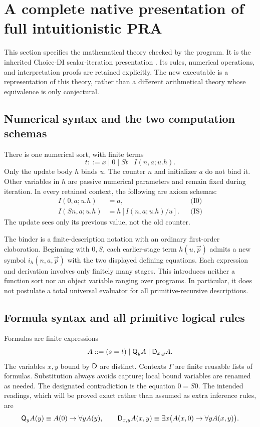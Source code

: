 \section{A complete native presentation of full intuitionistic PRA}
\label{sec:presentation}

This section specifies the mathematical theory checked by the program.
It is the inherited Choice-DI scalar-iteration presentation
\cite{uniform,arity}. Its rules, numerical operations, and interpretation
proofs are retained explicitly. The new executable is a representation
of this theory, rather than a different arithmetical theory whose
equivalence is only conjectural.

\subsection{Numerical syntax and the two computation schemas}

There is one numerical sort, with finite terms
\[
 t ::= x\mid 0\mid St\mid I(n,a;u.h).
\]
Only the update body $h$ binds $u$. The counter $n$ and initializer $a$
do not bind it. Other variables in $h$ are passive numerical parameters
and remain fixed during iteration. In every retained context, the
following are axiom schemas:
\begin{align}
 I(0,a;u.h)&=a, &&\text{(I0)}\label{eq:new-I0}\\
 I(Sn,a;u.h)&=h[I(n,a;u.h)/u]. &&\text{(IS)}\label{eq:new-IS}
\end{align}
The update sees only its previous value, not the old counter.

The binder is a finite-description notation with an ordinary first-order
elaboration. Beginning with $0,S$, each earlier-stage term
$h(u,\vec p)$ admits a new symbol $i_h(n,a,\vec p)$ with the two
displayed defining equations. Each expression and derivation involves
only finitely many stages. This introduces neither a function sort nor
an object variable ranging over programs. In particular, it does not
postulate a total universal evaluator for all primitive-recursive
descriptions.

\subsection{Formula syntax and all primitive logical rules}

Formulas are finite expressions
\[
 A ::= (s=t)\mid \mathsf Q_y A\mid\mathsf D_{x,y}A.
\]
The variables $x,y$ bound by $\mathsf D$ are distinct. Contexts $\Gamma$ are
finite reusable lists of formulas. Substitution always avoids capture;
local bound variables are renamed as needed. The designated
contradiction is the equation $0=S0$. The intended readings, which
will be proved exact rather than assumed as extra inference rules, are
\[
 \mathsf Q_y A(y)\equiv A(0)\to\forall y A(y),\qquad
 \mathsf D_{x,y}A(x,y)\equiv
 \exists x\bigl(A(x,0)\to\forall y A(x,y)\bigr).
\]

